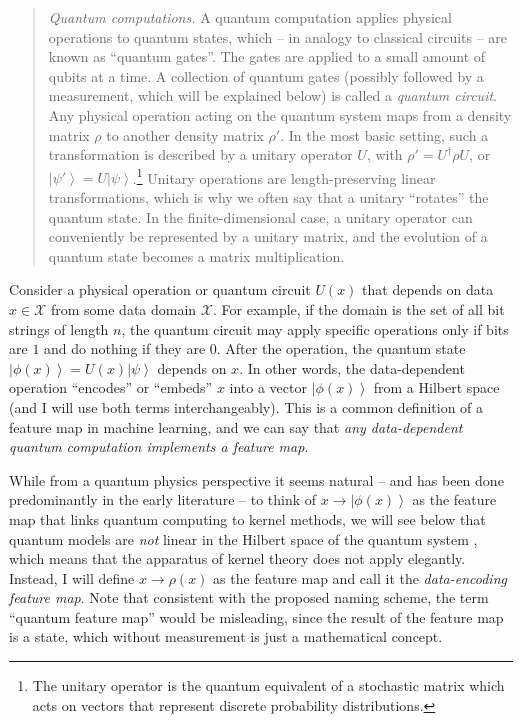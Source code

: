\documentclass[aps, reprint, onecolumn, nofootinbib, longbibliography]{revtex4-2}
\newcommand{\ket}[1]{\ensuremath{\left| #1 \right \rangle}}
\begin{document}
\begin{quote}
    \textit{Quantum computations.} A quantum computation applies physical operations to quantum states, which -- in analogy to classical circuits -- are known as ``quantum gates''. The gates are applied to a small amount of qubits at a time. A collection of quantum gates (possibly followed by a measurement, which will be explained below) is called a \textit{quantum circuit}. Any physical operation acting on the quantum system maps from a density matrix $\rho$ to another density matrix $\rho'$. In the most basic setting, such a transformation is described by a unitary operator $U$, with $\rho' = U^{\dagger} \rho U$, or $\ket{\psi'} = U \ket{\psi}$.\footnote{The unitary operator is the quantum equivalent of a stochastic matrix which acts on vectors that represent discrete probability distributions.} Unitary operations are length-preserving linear transformations, which is why we often say that a unitary ``rotates'' the quantum state. In the finite-dimensional case, a unitary operator can conveniently be represented by a unitary matrix, and the evolution of a quantum state becomes a matrix multiplication.
\end{quote}

Consider a physical operation or quantum circuit $U(x)$ that depends on data $x \in \mathcal{X}$ from some data domain $\mathcal{X}$. For example, if the domain is the set of all bit strings of length $n$, the quantum circuit may apply specific operations only if bits are $1$ and do nothing if they are $0$. After the operation, the quantum state $\ket{\phi(x)} = U(x) \ket{\psi}$ depends on $x$. In other words, the data-dependent operation ``encodes'' or ``embeds'' $x$ into a vector $\ket{\phi(x)}$ from a Hilbert space (and I will use both terms interchangeably). This is a common definition of a feature map in machine learning, and we can say that \textit{any data-dependent quantum computation implements a feature map}. 

While from a quantum physics perspective it seems natural -- and has been done predominantly in the early literature -- to think of $x \rightarrow \ket{\phi(x)}$ as the feature map that links quantum computing to kernel methods, we will see below that quantum models are \textit{not} linear in the Hilbert space of the quantum system \cite{havlivcek2019supervised}, which means that the apparatus of kernel theory does not apply elegantly. Instead, I will define $x \to \rho(x)$ as the feature map and call it the \textit{data-encoding feature map}. Note that consistent with the proposed naming scheme, the term ``quantum feature map'' would be misleading, since the result of the feature map is a state, which without measurement is just a mathematical concept.
\end{document}
